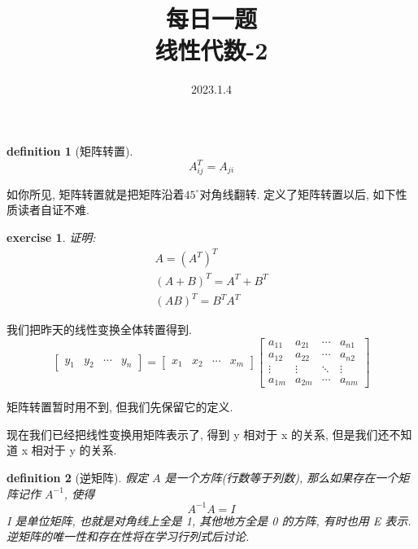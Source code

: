 \documentclass{ctexart}
\title{每日一题\\{\small 线性代数-2}}
\date{2023.1.4}
\newtheorem{definition}{definition}
\newtheorem{exercise}{exercise}
\begin{document}
    \maketitle {}

    \begin{definition}
        [矩阵转置]
        \begin{equation}
            A^T_{ij} = A_{ji}
        \end{equation}
    \end{definition}
    如你所见, 矩阵转置就是把矩阵沿着\(45^\circ\)对角线翻转.
    定义了矩阵转置以后, 如下性质读者自证不难.
    \begin{exercise}
        证明:
        \begin{equation}
            \begin{aligned}
                A = {(A^T)}^T \\
                {(A+B)}^T = A^T + B^T \\
                {(AB)}^T = B^{T}A^{T}
            \end{aligned}
        \end{equation}
    \end{exercise}
    我们把昨天的线性变换全体转置得到.
    \begin{equation}
        \begin{bmatrix}
            y_1 & y_2 & \cdots & y_n
        \end{bmatrix} = \begin{bmatrix}
            x_1 & x_2 & \cdots & x_m
        \end{bmatrix} \begin{bmatrix}
            a_{11} & a_{21} & \cdots & a_{n1} \\
            a_{12} & a_{22} & \cdots & a_{n2} \\
            \vdots & \vdots & \ddots & \vdots \\
            a_{1m} & a_{2m} & \cdots & a_{nm}
        \end{bmatrix}
    \end{equation}

    矩阵转置暂时用不到, 但我们先保留它的定义.

    现在我们已经把线性变换用矩阵表示了, 得到 y 相对于 x 的关系, 但是我们还不知道 x 相对于 y 的关系.

    \begin{definition}
        [逆矩阵] 假定 \(A\) 是一个方阵(行数等于列数), 那么如果存在一个矩阵记作 \(A^{-1}\), 使得
        \begin{equation}
            A^{-1}A = I
        \end{equation}
        I 是单位矩阵, 也就是对角线上全是 1, 其他地方全是 0 的方阵, 有时也用 E 表示.
        逆矩阵的唯一性和存在性将在学习行列式后讨论.
    \end{definition}
\end{document}

